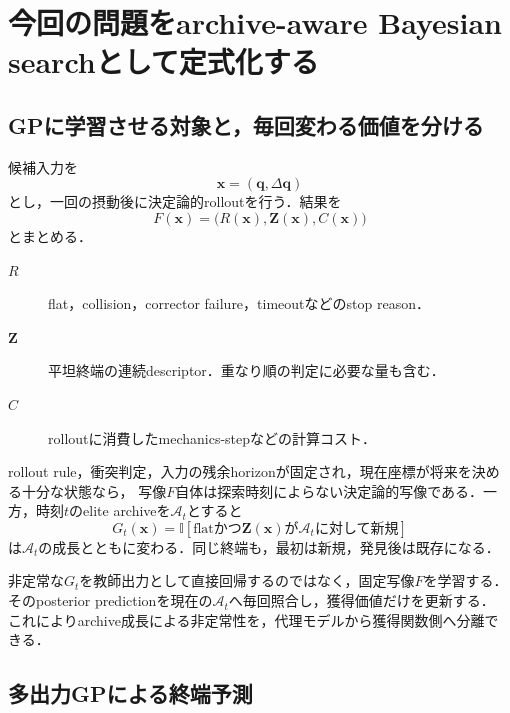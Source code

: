 \documentclass[a4paper,11pt]{ltjsarticle}
\newcommand{\A}{\mathcal A}
\newcommand{\ind}{\mathbb I}
\begin{document}
\section{今回の問題をarchive-aware Bayesian searchとして定式化する}
\label{sec:archive-aware}

\subsection{GPに学習させる対象と，毎回変わる価値を分ける}

候補入力を
\begin{equation}
  \bm x=(\bm q,\Delta\bm q)
\end{equation}
とし，一回の摂動後に決定論的rolloutを行う．結果を
\begin{equation}
  F(\bm x)
  =\bigl(R(\bm x),\bm Z(\bm x),C(\bm x)\bigr)
  \label{eq:full-terminal-map}
\end{equation}
とまとめる．
\begin{description}
  \item[\(R\)] flat，collision，corrector failure，timeoutなどのstop reason．
  \item[\(\bm Z\)] 平坦終端の連続descriptor．重なり順の判定に必要な量も含む．
  \item[\(C\)] rolloutに消費したmechanics-stepなどの計算コスト．
\end{description}

rollout rule，衝突判定，入力の残余horizonが固定され，現在座標が将来を決める十分な状態なら，
写像\(F\)自体は探索時刻によらない決定論的写像である．一方，時刻\(t\)のelite archiveを\(\A_t\)とすると
\begin{equation}
  G_t(\bm x)
  =\ind[\text{flatかつ}\bm Z(\bm x)\text{が}\A_t\text{に対して新規}]
  \label{eq:archive-dependent-reward}
\end{equation}
は\(\A_t\)の成長とともに変わる．同じ終端も，最初は新規，発見後は既存になる．

\begin{applicationbox}[非定常性をどこに隔離するか]
非定常な\(G_t\)を教師出力として直接回帰するのではなく，固定写像\(F\)を学習する．
そのposterior predictionを現在の\(\A_t\)へ毎回照合し，獲得価値だけを更新する．
これによりarchive成長による非定常性を，代理モデルから獲得関数側へ分離できる．
\end{applicationbox}

\subsection{多出力GPによる終端予測}
\end{document}
